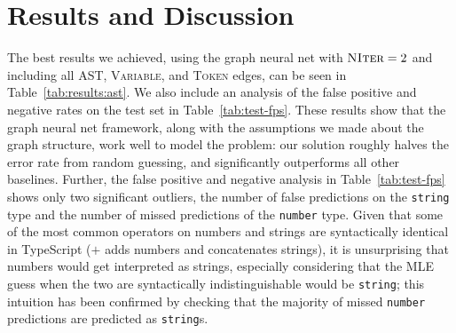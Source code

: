 \section{Results and Discussion}
\label{sec:results}
The best results we achieved, using the graph neural net with $\textsc{NIter}=2$ and including all AST, \textsc{Variable}, and \textsc{Token} edges, can be seen in Table~\ref{tab:results:ast}.
We also include an analysis of the false positive and negative rates on the test set in Table~\ref{tab:test-fps}.
These results show that the graph neural net framework, along with the assumptions we made about the graph structure, work well to model the problem: our solution roughly halves the error rate from random guessing, and significantly outperforms all other baselines.
Further, the false positive and negative analysis in Table~\ref{tab:test-fps} shows only two significant outliers, the number of false predictions on the \texttt{string} type and the number of missed predictions of the \texttt{number} type.
Given that some of the most common operators on numbers and strings are syntactically identical in TypeScript ($+$ adds numbers and concatenates strings), it is unsurprising that numbers would get interpreted as strings, especially considering that the MLE guess when the two are syntactically indistinguishable would be \texttt{string}; this intuition has been confirmed by checking that the majority of missed \texttt{number} predictions are predicted as \texttt{string}s.


